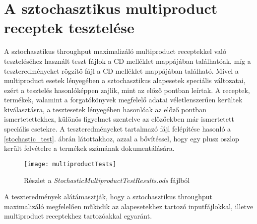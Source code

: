 \section{A sztochasztikus multiproduct receptek tesztelése}
A sztochasztikus throughput maximalizáló multiproduct receptekkel való teszteléséhez használt teszt fájlok a CD melléklet   mappájában találhatóak, míg a teszteredményeket rögzítő  fájl a CD melléklet  mappájában található.
Mivel a multiproduct esetek lényegében a sztochasztikus alapesetek speciális változatai, ezért a tesztelés hasonlóképpen zajlik, mint az előző pontban leírtak.
A receptek, termékek, valamint a forgatókönyvek megfelelő adatai véletlenszerűen kerültek kiválasztásra, a tesztesetek lényegében hasonlóak az előző pontban ismertetettekhez, különös figyelmet szentelve az előzőekben már ismertetett speciális esetekre.
A teszteredményeket tartalmazó  fájl felépítése hasonló a \ref{stochastic_test}. ábrán látottakhoz, azzal a bővítéssel, hogy egy plusz oszlop került felvételre a termékek számának dokumentálására.
\begin{figure}[H]
\begin{center}
\texttt{[image: multiproductTests]}
\caption{Részlet a \textit{StochasticMultiproductTestResults.ods} fájlból}
\label{multiproduct_test}
\end{center}
\end{figure}
A teszteredmények alátámasztják, hogy a sztochasztikus throughput maximalizáló megfelelően működik az alapesetekhez tartozó inputfájlokkal, illetve multiproduct receptekhez tartozóakkal egyaránt.
